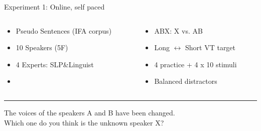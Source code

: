 \documentclass[xcolor={dvipsnames}]{beamer}
\begin{document}
\begin{frame}{Experiment 1: Online, self paced}
\begin{columns}
\begin{column}{0.48\textwidth}
\begin{itemize}
    \item Pseudo Sentences (IFA corpus)
    \item 10 Speakers (5F)
    \item 4 Experts: SLP\&Linguist
    \item[ ] \ 
\end{itemize}
\end{column}
\begin{column}{0.48\textwidth}
\begin{itemize}
    \item ABX: X vs. AB
    \item[ ] Long $\leftrightarrow$ Short VT target
    \item 4 practice + 4 x 10 stimuli
    \item Balanced distractors
\end{itemize}
\end{column}
\end{columns}
\vskip 1cm
\hrule
\vskip 0.5cm
The voices of the speakers A and B have been changed. \\
Which one do you think is the unknown speaker X?
\vskip 0.5cm


\end{frame}
\end{document}

